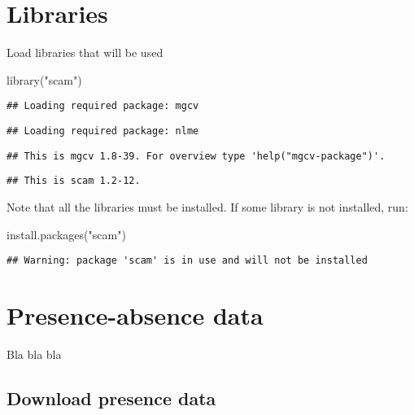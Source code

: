 \documentclass[
]{book}
\newenvironment{Shaded}{\begin{snugshade}}{\end{snugshade}}
\newcommand{\FunctionTok}[1]{\textcolor[rgb]{0.00,0.00,0.00}{#1}}
\newcommand{\NormalTok}[1]{#1}
\newcommand{\StringTok}[1]{\textcolor[rgb]{0.31,0.60,0.02}{#1}}
\begin{document}
\hypertarget{libraries}{%
\chapter{Libraries}\label{libraries}}

Load libraries that will be used

\begin{Shaded}
\begin{Highlighting}[]
\FunctionTok{library}\NormalTok{(}\StringTok{"scam"}\NormalTok{)}
\end{Highlighting}
\end{Shaded}

\begin{verbatim}
## Loading required package: mgcv
\end{verbatim}

\begin{verbatim}
## Loading required package: nlme
\end{verbatim}

\begin{verbatim}
## This is mgcv 1.8-39. For overview type 'help("mgcv-package")'.
\end{verbatim}

\begin{verbatim}
## This is scam 1.2-12.
\end{verbatim}

Note that all the libraries must be installed. If some library is not installed, run:

\begin{Shaded}
\begin{Highlighting}[]
\FunctionTok{install.packages}\NormalTok{(}\StringTok{"scam"}\NormalTok{)}
\end{Highlighting}
\end{Shaded}

\begin{verbatim}
## Warning: package 'scam' is in use and will not be installed
\end{verbatim}

\hypertarget{presence-absence-data}{%
\chapter{Presence-absence data}\label{presence-absence-data}}

Bla bla bla

\hypertarget{download-presence-data}{%
\section{Download presence data}\label{download-presence-data}}
\end{document}

